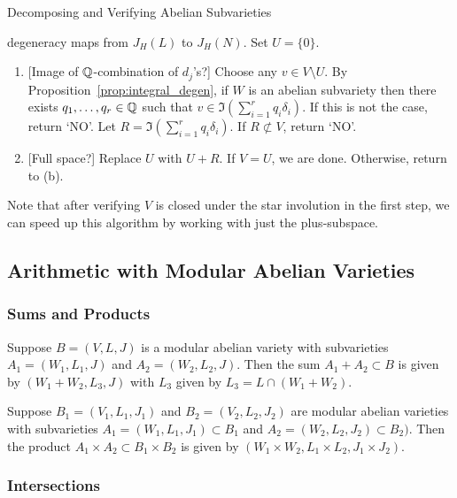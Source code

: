 \documentclass{article}
\begin{document}
\begin{algorithm}{Decomposing and Verifying Abelian Subvarieties}
\begin{enumerate}
            degeneracy maps from $J_H(L)$ to $J_H(N)$.  Set $U=\{0\}$.
            \begin{enumerate}
                \item{} [Image of $\mathbb{Q}$-combination of $d_j$'s?]
                    Choose any $v\in V\setminus U$. By
                    Proposition~\ref{prop:integral_degen}, if $W$ is an abelian
                    subvariety then there exists $q_1,\ldots,q_r\in \mathbb{Q}$
                    such that $v\in \Im \left(\sum_{i=1} ^r q_i
                    \delta_i\right)$. If this is not the case, return
                    `NO'. Let $R = \Im \left(\sum_{i=1} ^r q_i
                    \delta_i\right)$. If $R\not\subset V$, return `NO'.
                \item{} [Full space?]
                    Replace $U$ with $U+R$. If $V=U$, we are done. Otherwise,
                    return to (b).
            \end{enumerate}
    \end{enumerate}
\end{algorithm}

Note that after verifying $V$ is closed under the star involution in the first
step, we can speed up this algorithm by working with just the plus-subspace. 

\subsection{Arithmetic with Modular Abelian Varieties}

\subsubsection{Sums and Products}

Suppose $B=(V, L, J)$ is a modular abelian variety with subvarieties $A_1=(W_1,
L_1, J)$ and $A_2=(W_2, L_2, J)$. Then the sum $A_1+A_2\subset B$ is given by
$(W_1+W_2, L_3, J)$ with $L_3$ given by $L_3 = L\cap (W_1+W_2)$.

Suppose $B_1=(V_1, L_1, J_1)$ and $B_2=(V_2, L_2, J_2)$ are modular abelian
varieties with subvarieties $A_1=(W_1, L_1, J_1)\subset B_1$ and $A_2=(W_2,
L_2, J_2)\subset B_2)$. Then the product $A_1\times A_2\subset B_1\times
B_2$ is given by $(W_1\times W_2, L_1\times L_2, J_1\times J_2)$.

\subsubsection{Intersections}
\label{sec:modabvar_intersections}
\end{document}
